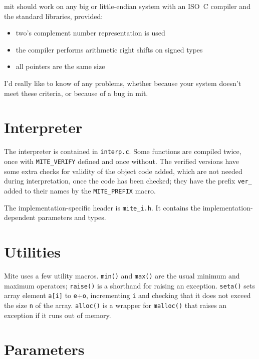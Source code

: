 \documentclass[english]{scrartcl}
\begin{document}
mit should work on any big or little-endian system with an ISO~C compiler
and the standard libraries, provided:

\begin{itemize}
\item two's complement number representation is used
\item the compiler performs arithmetic right shifts on signed types
\item all pointers are the same size
\end{itemize}

\noindent I'd really like to know of any problems, whether because your system
doesn't meet these criteria, or because of a bug in mit.



\section{Interpreter}

The interpreter is contained in \verb|interp.c|. Some functions are
compiled twice, once with \verb|MITE_VERIFY| defined and once without. 
The verified versions have some extra checks for validity of the
object code added, which are not needed during interpretation, once
the code has been checked; they have the prefix \verb|ver_| added to
their names by the \verb|MITE_PREFIX| macro.

The implementation-specific header is \verb|mite_i.h|. It contains the
implementation-dependent parameters and types.



\section{Utilities}

Mite uses a few utility macros. \verb|min()| and \verb|max()| are the usual
minimum and maximum operators; \verb|raise()| is a shorthand for raising an
exception. \verb|seta()| sets array element \verb|a[i]| to \verb|e|$+$\verb|o|,
incrementing \verb|i| and checking that it does not exceed the size \verb|n| of
the array. \verb|alloc()| is a wrapper for \verb|malloc()| that raises an
exception if it runs out of memory.



\section{Parameters}
\end{document}
